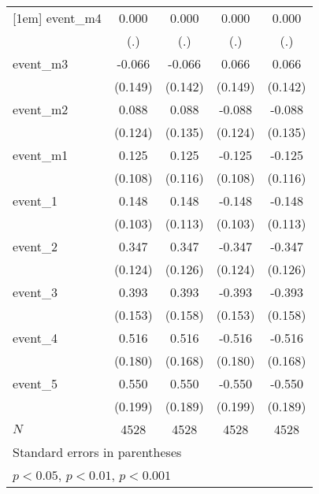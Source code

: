{\begin{tabular}{l*{4}{c}}
[1em]
event\_m4    &       0.000         &       0.000         &       0.000         &       0.000         \\
            &         (.)         &         (.)         &         (.)         &         (.)         \\
[1em]
event\_m3    &      -0.066         &      -0.066         &       0.066         &       0.066         \\
            &     (0.149)         &     (0.142)         &     (0.149)         &     (0.142)         \\
[1em]
event\_m2    &       0.088         &       0.088         &      -0.088         &      -0.088         \\
            &     (0.124)         &     (0.135)         &     (0.124)         &     (0.135)         \\
[1em]
event\_m1    &       0.125         &       0.125         &      -0.125         &      -0.125         \\
            &     (0.108)         &     (0.116)         &     (0.108)         &     (0.116)         \\
[1em]
event\_1     &       0.148         &       0.148         &      -0.148         &      -0.148         \\
            &     (0.103)         &     (0.113)         &     (0.103)         &     (0.113)         \\
[1em]
event\_2     &       0.347\sym{**} &       0.347\sym{**} &      -0.347\sym{**} &      -0.347\sym{**} \\
            &     (0.124)         &     (0.126)         &     (0.124)         &     (0.126)         \\
[1em]
event\_3     &       0.393\sym{*}  &       0.393\sym{*}  &      -0.393\sym{*}  &      -0.393\sym{*}  \\
            &     (0.153)         &     (0.158)         &     (0.153)         &     (0.158)         \\
[1em]
event\_4     &       0.516\sym{**} &       0.516\sym{**} &      -0.516\sym{**} &      -0.516\sym{**} \\
            &     (0.180)         &     (0.168)         &     (0.180)         &     (0.168)         \\
[1em]
event\_5     &       0.550\sym{**} &       0.550\sym{**} &      -0.550\sym{**} &      -0.550\sym{**} \\
            &     (0.199)         &     (0.189)         &     (0.199)         &     (0.189)         \\
\hline
\(N\)       &        4528         &        4528         &        4528         &        4528         \\
\hline\hline
\multicolumn{5}{l}{\footnotesize Standard errors in parentheses}\\
\multicolumn{5}{l}{\footnotesize \sym{*} \(p<0.05\), \sym{**} \(p<0.01\), \sym{***} \(p<0.001\)}\\
\end{tabular}
}
